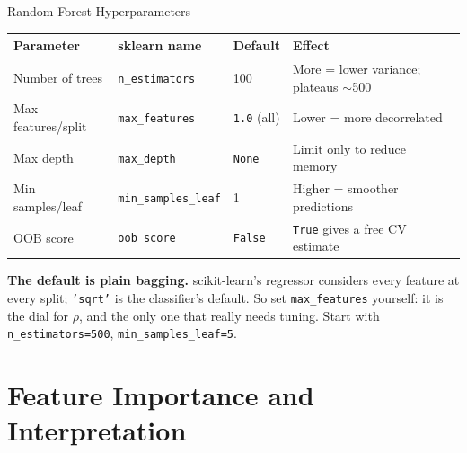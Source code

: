 \documentclass[aspectratio=169, 11pt]{beamer}
\begin{document}
\begin{frame}{Random Forest Hyperparameters}
  \begin{center}
    {\footnotesize
    \begin{tabular}{p{3.0cm}p{2.8cm}p{1.8cm}p{4.0cm}}
      \toprule
      \textbf{Parameter} & \textbf{sklearn name} & \textbf{Default} & \textbf{Effect} \\
      \midrule
      Number of trees & \texttt{n\_estimators} & 100 & More = lower variance; plateaus $\sim$500 \\
      Max features/split & \texttt{max\_features} & \texttt{1.0} (all) & Lower = more decorrelated \\
      Max depth & \texttt{max\_depth} & \texttt{None} & Limit only to reduce memory \\
      Min samples/leaf & \texttt{min\_samples\_leaf} & 1 & Higher = smoother predictions \\
      OOB score & \texttt{oob\_score} & \texttt{False} & \texttt{True} gives a free CV estimate \\
      \bottomrule
    \end{tabular}
    }
  \end{center}

  \textbf{The default is plain bagging.} scikit-learn's regressor considers every feature at
  every split; \texttt{'sqrt'} is the classifier's default. So set \texttt{max\_features}
  yourself: it is the dial for $\rho$, and the only one that really needs tuning. Start with
  \texttt{n\_estimators=500}, \texttt{min\_samples\_leaf=5}.

\end{frame}

\section{Feature Importance and Interpretation}

\end{document}
